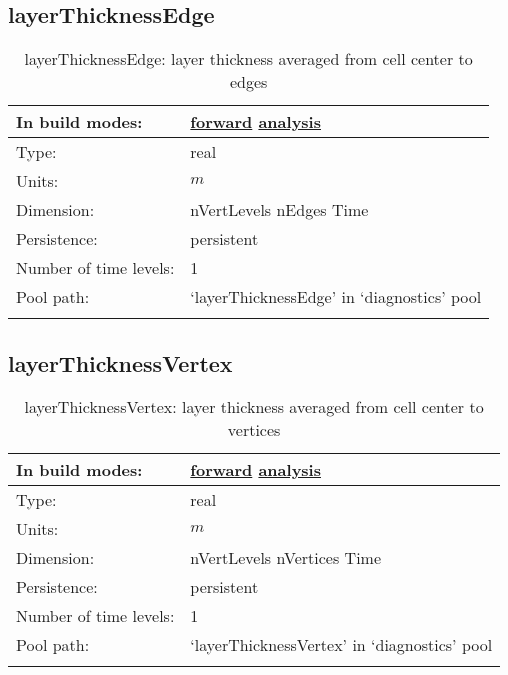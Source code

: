 \subsection[layerThicknessEdge]{layerThicknessEdge}
\label{subsec:var_sec_diagnostics_layerThicknessEdge}
\begin{center}
\begin{longtable}{| p{2.0in} | p{4.0in} |}
        \hline 
        In build modes: & \hyperref[subsec:forward_var_tab_diagnostics]{forward} \hyperref[subsec:analysis_var_tab_diagnostics]{analysis} \\
        \hline 
        Type: & real \\
        \hline 
        Units: & $m$ \\
        \hline 
        Dimension: & nVertLevels nEdges Time \\
        \hline 
        Persistence: & persistent \\
        \hline 
        Number of time levels: & 1 \\
        \hline 
            Pool path: & `layerThicknessEdge' in `diagnostics' pool \\
		 \hline 
    \caption{layerThicknessEdge: layer thickness averaged from cell center to edges}
\end{longtable}
\end{center}
\subsection[layerThicknessVertex]{layerThicknessVertex}
\label{subsec:var_sec_diagnostics_layerThicknessVertex}
\begin{center}
\begin{longtable}{| p{2.0in} | p{4.0in} |}
        \hline 
        In build modes: & \hyperref[subsec:forward_var_tab_diagnostics]{forward} \hyperref[subsec:analysis_var_tab_diagnostics]{analysis} \\
        \hline 
        Type: & real \\
        \hline 
        Units: & $m$ \\
        \hline 
        Dimension: & nVertLevels nVertices Time \\
        \hline 
        Persistence: & persistent \\
        \hline 
        Number of time levels: & 1 \\
        \hline 
            Pool path: & `layerThicknessVertex' in `diagnostics' pool \\
		 \hline 
    \caption{layerThicknessVertex: layer thickness averaged from cell center to vertices}
\end{longtable}
\end{center}
